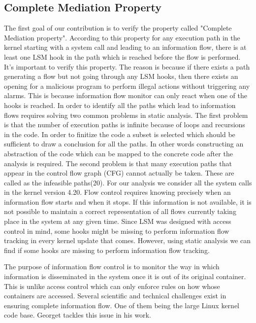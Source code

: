 \subsection{Complete Mediation Property}
The first goal of our contribution is to verify the property called "Complete Mediation property". According to this property for any execution path in the kernel starting with a system call and leading to an information flow, there is at least one LSM hook in the path which is reached before the flow is performed. It's important to verify this property. The reason is because if there exists a path generating a flow but not going through any LSM hooks, then there exists an opening for a malicious program to perform illegal actions without triggering any alarms. This is because information flow monitor can only react when one of the hooks is reached. 
\vskip 0.1in
In order to identify all the paths which lead to information flows requires solving two common problems in static analysis. The first problem is that the number of execution paths is infinite because of loops and recursions in the code. In order to finitize the code a subset is selected which should be sufficient to draw a conclusion for all the paths. In other words constructing an abstraction of the code which can be mapped to the concrete code after the analysis is required. The second problem  is that many execution paths that appear in the control flow graph (CFG) cannot actually be taken. These are called as the infeasible paths(20).  
\vskip 0.2in
For our analysis we consider all the system calls in the kernel version 4.20. Flow control requires knowing precisely when an information flow starts and when it stops. If this information is not available, it is not possible to maintain a correct representation of all flows currently taking place in the system at any given time. Since LSM was designed with access control in mind, some hooks might be missing to perform information flow tracking in every kernel update that comes. However, using static analysis we can find if some hooks are missing to perform information flow tracking. 


\label{Information flow}
The purpose of information flow control is to monitor the way in which information is disseminated in the system once it is out of its original container. This is unlike access control which can only enforce rules on how whose containers are accessed. Several scientific and technical challenges exist in ensuring complete information flow. One of them being the large Linux kernel code base. Georget tackles this issue in his work.




